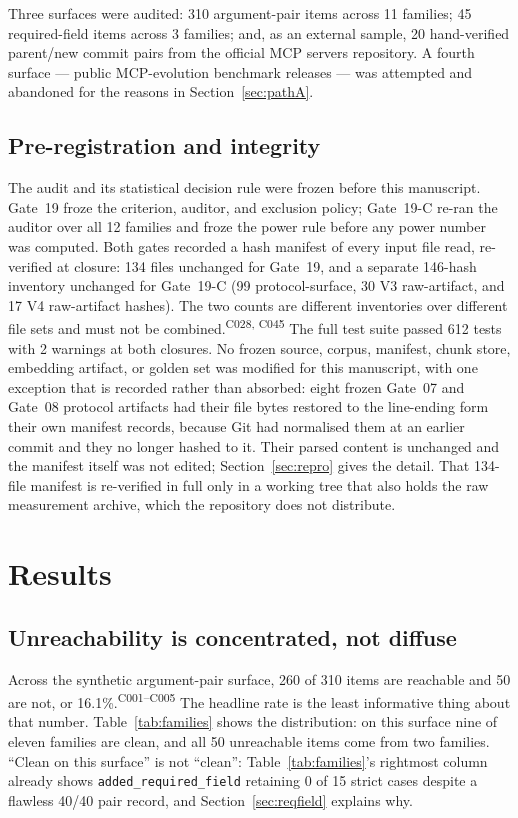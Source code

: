 \documentclass[11pt]{article}
\newcommand{\ledger}[1]{\textsuperscript{\textsf{\scriptsize #1}}}
\newcommand{\dfam}[1]{\texttt{#1}}
\begin{document}
Three surfaces were audited: 310 argument-pair items across 11 families; 45
required-field items across 3 families; and, as an external sample, 20
hand-verified parent/new commit pairs from the official MCP servers
repository. A fourth surface --- public MCP-evolution benchmark releases ---
was attempted and abandoned for the reasons in Section~\ref{sec:pathA}.

\subsection{Pre-registration and integrity}

The audit and its statistical decision rule were frozen before this
manuscript. Gate~19 froze the criterion, auditor, and exclusion policy;
Gate~19-C re-ran the auditor over all 12 families and froze the power rule
before any power number was computed. Both gates recorded a hash manifest of
every input file read, re-verified at closure: 134 files unchanged for
Gate~19, and a separate 146-hash inventory unchanged for Gate~19-C
(99 protocol-surface, 30 V3 raw-artifact, and 17 V4 raw-artifact hashes).
The two counts are different inventories over different file sets and must not
be combined.\ledger{C028, C045} The full test suite passed 612 tests with 2
warnings at both closures. No frozen source, corpus, manifest, chunk store,
embedding artifact, or golden set was modified for this manuscript, with one
exception that is recorded rather than absorbed: eight frozen Gate~07 and
Gate~08 protocol artifacts had their file bytes restored to the line-ending
form their own manifest records, because Git had normalised them at an earlier
commit and they no longer hashed to it. Their parsed content is unchanged and
the manifest itself was not edited; Section~\ref{sec:repro} gives the detail.
That 134-file manifest is re-verified in full only in a working tree that also
holds the raw measurement archive, which the repository does not distribute.

\section{Results}

\subsection{Unreachability is concentrated, not diffuse}

Across the synthetic argument-pair surface, 260 of 310 items are reachable and
50 are not, or 16.1\%.\ledger{C001--C005} The headline rate is the least
informative thing about that number. Table~\ref{tab:families} shows the
distribution: on this surface nine of eleven families are clean, and all 50
unreachable items come from two families. ``Clean on this surface'' is not
``clean'': Table~\ref{tab:families}'s rightmost column already shows
\dfam{added\_required\_field} retaining 0 of 15 strict cases despite a
flawless 40/40 pair record, and Section~\ref{sec:reqfield} explains why.
\end{document}

